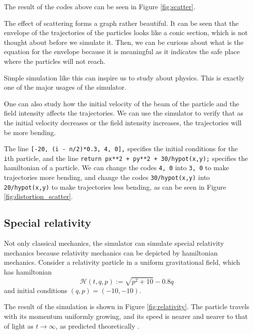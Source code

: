 \documentclass[12pt]{article}
\begin{document}
The result of the codes above can be seen in Figure \ref{fig:scatter}.

The effect of scattering forms a graph rather beautiful.
It can be seen that the envelope of the trajectories of the particles
looks like a conic section, which is not thought about before we simulate it.
Then, we can be curious about what is the equation for the envelope
because it is meaningful as it indicates the safe place
where the particles will not reach.

Simple simulation like this can inspire us to study about physics.
This is exactly one of the major usages of the simulator.

One can also study how the initial velocity of the beam of the particle and the field intensity affects the trajectories.
We can use the simulator to verify that as the initial velocity decreases or the field intensity increases, the trajectories will be more bending.

The line \texttt{[-20, (i - n/2)*0.3, 4, 0],} specifies the initial conditions for the \texttt{i}th particle,
and the line \texttt{return px**2 + py**2 + 30/hypot(x,y);} specifies the hamiltonian of a particle.
We can change the codes \texttt{4, 0} into \texttt{3, 0} to make trajectories more bending,
and change the codes \texttt{30/hypot(x,y)} into \texttt{20/hypot(x,y)} to make trajectories less bending,
as can be seen in Figure \ref{fig:distortion_scatter}.

\subsection{Special relativity}

Not only classical mechanics, the simulator can simulate special relativity mechanics
because relativity mechanics can be depicted by hamiltonian mechanics.
Consider a relativity particle in a uniform gravitational field, which has hamiltonian \cite[p. 28]{landau2010fields}
\begin{equation*}
  \mathcal H\left(t,q,p\right):=\sqrt{p^2+10}-0.8q
\end{equation*}
and initial conditions $\left(q,p\right)=\left(-10,-10\right)$.

The result of the simulation is shown in Figure \ref{fig:relativity}.
The particle travels with its momentum uniformly growing,
and its speed is nearer and nearer to that of light as $t\rightarrow\infty$,
as predicted theoretically \cite[p. 24]{landau2010fields}.
\end{document}
